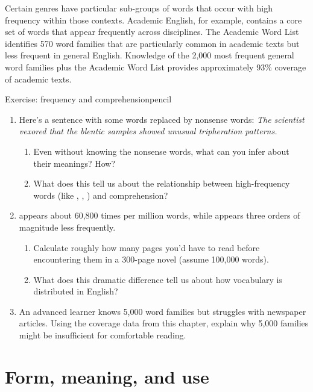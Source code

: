 Certain genres have particular sub-groups of words that occur with high frequency within those contexts. Academic English, for example, contains a core set of words that appear frequently across disciplines. The Academic Word List \citep{coxhead2000academic} identifies 570 word families that are particularly common in academic texts but less frequent in general English. Knowledge of the 2,000 most frequent general word families plus the Academic Word List provides approximately 93\% coverage of academic texts.

\begin{tblsframedsymbol}{Exercise: frequency and comprehension}{pencil}
\begin{enumerate}[noitemsep, leftmargin=*]
    \item Here's a sentence with some words replaced by nonsense words:
    \textit{The scientist \emph{vexored} that the \emph{blentic} samples showed unusual \emph{tripheration} patterns.}
    \begin{enumerate}[nosep]
        \item Even without knowing the nonsense words, what can you infer about their meanings? How?
        \item What does this tell us about the relationship between high-frequency words (like , , ) and comprehension?
    \end{enumerate}

    \item {} appears about 60,800 times per million words, while  appears three orders of magnitude less frequently.
    \begin{enumerate}[nosep]
        \item Calculate roughly how many pages you'd have to read before encountering them in a 300-page novel (assume 100,000 words).
        \item What does this dramatic difference tell us about how vocabulary is distributed in English?
    \end{enumerate}

    \item An advanced learner knows 5,000 word families but struggles with newspaper articles. Using the coverage data from this chapter, explain why 5,000 families might be insufficient for comfortable reading.
\end{enumerate}
\end{tblsframedsymbol}

\section{Form, meaning, and use} \label{sec:form-meaning-use}

